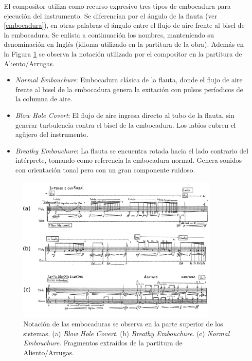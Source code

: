 \documentclass{article}
\begin{document}
El compositor utiliza como recurso expresivo tres tipos de embocadura para ejecución del instrumento. Se diferencian por el ángulo de la flauta (ver \ref{embocadura}), en otras palabras el ángulo entre el flujo de aire frente al bisel de la embocadura. Se enlista a continuación los nombres, manteniendo su denominación en Inglés (idioma utilizado en la partitura de la obra). Además en la Figura \ref{fig:embocaduras} se observa la notación utilizada por el compositor en la partitura de Aliento/Arrugas.

\begin{itemize}
  \item \textit{Normal Embouchure}: Embocadura clásica de la flauta, donde el flujo de aire frente al bisel de la embocadura genera la exitación con pulsos períodicos de la columna de aire. 
  \item \textit{Blow Hole Covert}: El flujo de aire ingresa directo al tubo de la flauta, sin generar turbulencia contra el bisel de la embocadura. Los labios cubren el agüjero del instrumento.
  \item \textit{Breathy Embouchure}: La flauta se encuentra rotada hacia el lado contrario del intérprete, tomando como referencia la embocadura normal. Genera sonidos con orientación tonal pero con un gran componente ruidoso.
\end{itemize}
\medskip

\begin{figure}[H]
\begin{center}
\includegraphics[width=0.9\textwidth]{embocaduras} 
\caption{Notación de las embocaduras se observa en la parte superior de los sistemas. (a) \textit{Blow Hole Covert}. (b) \textit{Breathy Embouchure}. (c) \textit{Normal Embouchure}. Fragmentos extraídos de la partitura de Aliento/Arrugas.}
\label{fig:embocaduras}
\end{center}
\end{figure}
\end{document}
